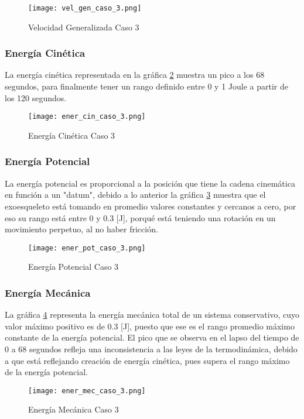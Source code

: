     \begin{figure}[H]%
            \centering
            \texttt{[image: vel\_gen\_caso\_3.png]} 
        \caption{Velocidad Generalizada Caso 3}
        \label{fig:VelGenC3}
    \end{figure}

    \subsubsection{Energía Cinética}

    La energía cinética representada en la gráfica \ref{fig:eCinC3} muestra 
    un pico a los 68 segundos, para finalmente tener un rango definido entre 
    0 y 1 Joule a partir de los 120 segundos.

    \begin{figure} [H]%
            \centering
            \texttt{[image: ener\_cin\_caso\_3.png]} 
        \caption{Energía Cinética Caso 3}
        \label{fig:eCinC3}
    \end{figure}

    \subsubsection{Energía Potencial}

    La energía potencial es proporcional a la posición que tiene la cadena 
    cinemática en función a un "datum", debido a lo anterior la gráfica 
    \ref{fig:ePotC3} muestra que el exoesqueleto está tomando en promedio 
    valores constantes y cercanos a cero, por eso su rango está entre 0 y 
    0.3 [J], porqué está teniendo una rotación en un movimiento perpetuo, 
    al no haber fricción.

    \begin{figure} [H]%
            \centering
            \texttt{[image: ener\_pot\_caso\_3.png]} 
        \caption{Energía Potencial Caso 3}
        \label{fig:ePotC3}
    \end{figure}

    \subsubsection{Energía Mecánica}

    La gráfica \ref{fig:eMecC3} representa la energía mecánica total de 
    un sistema conservativo, cuyo valor máximo positivo es de 0.3 [J], puesto 
    que ese es el rango promedio máximo constante de la energía potencial. 
    El pico que se observa en el lapso del tiempo de 0 a 68 segundos 
    refleja una inconsistencia a las leyes de la termodinámica, debido 
    a que está reflejando creación de energía cinética, pues supera el 
    rango máximo de la energía potencial.

    \begin{figure}[H]%
            \centering
            \texttt{[image: ener\_mec\_caso\_3.png]} 
        \caption{Energía Mecánica Caso 3}
        \label{fig:eMecC3}
    \end{figure}